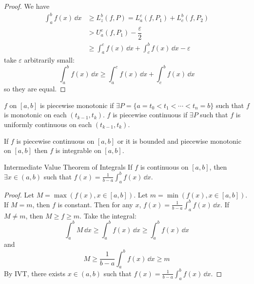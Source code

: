 \documentclass{report}
\begin{document}
\begin{proof}
        We have
            \begin{align*}
                \int_{a}^{b} f(x) \, \dd{x}  &\geq  L_{z}^{b}(f, P) = L_{a}^{c}(f, P_{1}) + L_{c}^{b}(f, P_{2}) \\
                                             &>     U_{a}^{c}(f, P_{1}) - \dfrac{\varepsilon}{ 2}               \\
                                             &\geq  \int_{a}^{c} f(x) \, \dd{x} + \int_{c}^{b} f(x) \, \dd{x}  - \varepsilon   
            \end{align*}
        take $\varepsilon$ arbitrarily small:
            \begin{equation*}
                \int_{a}^{b} f(x) \, \dd{x}  \geq \int_{ a}^{c} f(x) \, \dd{x}  + \int_{c}^{b} f(x) \, \dd{x} 
            \end{equation*}
        so they are equal.
    \end{proof} 

\begin{definition}{33.7}
    $f$ on $[a, b]$ is piecewise monotonic if $\exists P = \{ a = t_{0} < t_{ 1} < \cdots < t_{ n} = b\}$ such that $f$ is monotonic on each $(t_{k - 1}, t_{k})$. $f$ is piecewise continuous if $\exists P$ such that $f$ is uniformly continuous on each $(t_{k - 1}, t_{k})$.
\end{definition}

\begin{theorem}{33.8}
    If $f$ is piecewise continuous on $[a, b]$ or it is bounded and piecewise monotonic on $[a, b]$ then $f$ is integrable on $[a, b]$.
\end{theorem}

\begin{theorem}{Intermediate Value Theorem of Integrals}
    If $f$ is continuous on $[a, b]$, then $\exists x \in  ( a, b)$ such that $f(x) = \frac{1}{b - a}\int_{a}^{b} f(x) \, \dd{x} $.
\end{theorem}
    \begin{proof}
        Let $M = \max(f(x), x \in [ a, b])$. Let $m = \min(f(x), x \in [ a, b])$. If $M = m$, then $f$ is constant. Then for any $x$, $f(x) = \frac{1}{b - a}\int_{a}^{b} f(x) \, \dd{x} $. If $M \neq m$, then $M \geq f \geq  m$. Take the integral:
            \begin{equation*}
                \int_{a}^{b} M \, \dd{x} \geq \int_{ a}^{b} f(x) \, \dd{x} \geq \int_{ a}^{b} f(x) \, \dd{x} 
            \end{equation*}
        and
            \begin{equation*}
                 M \geq\dfrac{ 1}{b - a}\int_{a}^{b} f(x) \, \dd{x}  \geq m
            \end{equation*}
        By IVT, there exists $x \in  (a,b)$ such that $f(x) = \frac{1}{b - a}\int_{a}^{b} f(x) \, \dd{x} $.
    \end{proof}
\end{document}
